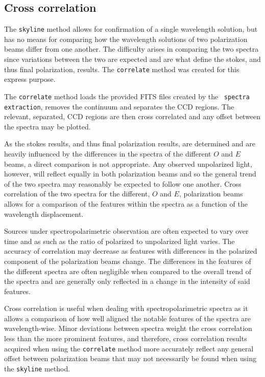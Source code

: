 \subsection{Cross correlation}

\prgph

The \texttt{skyline} method allows for confirmation of a single wavelength solution, but has no means for comparing how the wavelength solutions of two polarization beams differ from one another. The difficulty arises in comparing the two spectra since variations between the two are expected and are what define the stokes, and thus final polarization, results. The \texttt{correlate} method was created for this express purpose.
\prgph

The \texttt{correlate} method loads the provided \gls{FITS} files created by the \polsalt\ \texttt{spectra extraction}, removes the continuum and separates the \gls{CCD} regions. The relevant, separated, \gls{CCD} regions are then cross correlated and any offset between the spectra may be plotted.
\prgph

As the stokes results, and thus final polarization results, are determined and are heavily influenced by the differences in the spectra of the different $O$ and $E$ beams, a direct comparison is not appropriate. Any observed unpolarized light, however, will reflect equally in both polarization beams and so the general trend of the two spectra may reasonably be expected to follow one another. Cross correlation of the two spectra for the different, $O$ and $E$, polarization beams allows for a comparison of the features within the spectra as a function of the wavelength displacement.
\prgph

Sources under spectropolarimetric observation are often expected to vary over time and as such as the ratio of polarized to unpolarized light varies. The accuracy of correlation may decrease as features with differences in the polarized component of the polarization beams change. The differences in the features of the different spectra are often negligible when compared to the overall trend of the spectra and are generally only reflected in a change in the intensity of said features.
\prgph

Cross correlation is useful when dealing with spectropolarimetric spectra as it allows a comparison of how well aligned the notable features of the spectra are wavelength-wise. Minor deviations between spectra weight the cross correlation less than the more prominent features, and therefore, cross correlation results acquired when using the \texttt{correlate} method more accurately reflect any general offset between polarization beams that may not necessarily be found when using the \texttt{skyline} method.


